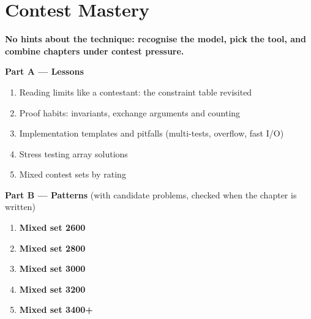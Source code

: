 \chapter{Contest Mastery}
\label{ch:mastery}

\begin{tcolorbox}[enhanced, colback=white, colframe=secondaryblue, boxrule=1pt, arc=2mm]
\textbf{\large\textcolor{primaryblue}{No hints about the technique: recognise the model, pick the tool, and combine chapters under contest pressure.}}
\end{tcolorbox}


\begin{plannedbox}
\textbf{Part A --- Lessons}
\begin{enumerate}[leftmargin=*, label=\textbf{A\arabic*.}, itemsep=1pt]
    \item Reading limits like a contestant: the constraint table revisited
    \item Proof habits: invariants, exchange arguments and counting
    \item Implementation templates and pitfalls (multi-tests, overflow, fast I/O)
    \item Stress testing array solutions
    \item Mixed contest sets by rating
\end{enumerate}
\textbf{Part B --- Patterns} (with candidate problems, checked when the chapter is written)
\begin{enumerate}[leftmargin=*, label=\textbf{P\arabic*.}, itemsep=1pt]
    \item \textbf{Mixed set 2600}
    \item \textbf{Mixed set 2800}
    \item \textbf{Mixed set 3000}
    \item \textbf{Mixed set 3200}
    \item \textbf{Mixed set 3400+}
\end{enumerate}
\end{plannedbox}
